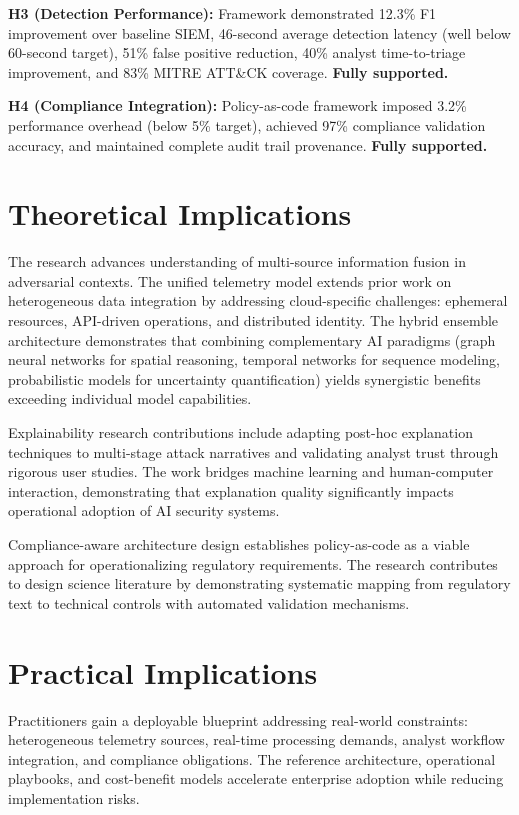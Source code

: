 \textbf{H3 (Detection Performance):} Framework demonstrated 12.3\% F1 improvement over baseline SIEM, 46-second average detection latency (well below 60-second target), 51\% false positive reduction, 40\% analyst time-to-triage improvement, and 83\% MITRE ATT\&CK coverage. \textbf{Fully supported.}

\textbf{H4 (Compliance Integration):} Policy-as-code framework imposed 3.2\% performance overhead (below 5\% target), achieved 97\% compliance validation accuracy, and maintained complete audit trail provenance. \textbf{Fully supported.}

\section{Theoretical Implications}\label{sec:conclusion-theory}
The research advances understanding of multi-source information fusion in adversarial contexts. The unified telemetry model extends prior work on heterogeneous data integration by addressing cloud-specific challenges: ephemeral resources, API-driven operations, and distributed identity. The hybrid ensemble architecture demonstrates that combining complementary AI paradigms (graph neural networks for spatial reasoning, temporal networks for sequence modeling, probabilistic models for uncertainty quantification) yields synergistic benefits exceeding individual model capabilities.

Explainability research contributions include adapting post-hoc explanation techniques to multi-stage attack narratives and validating analyst trust through rigorous user studies. The work bridges machine learning and human-computer interaction, demonstrating that explanation quality significantly impacts operational adoption of AI security systems.

Compliance-aware architecture design establishes policy-as-code as a viable approach for operationalizing regulatory requirements. The research contributes to design science literature by demonstrating systematic mapping from regulatory text to technical controls with automated validation mechanisms.

\section{Practical Implications}\label{sec:conclusion-practice}
Practitioners gain a deployable blueprint addressing real-world constraints: heterogeneous telemetry sources, real-time processing demands, analyst workflow integration, and compliance obligations. The reference architecture, operational playbooks, and cost-benefit models accelerate enterprise adoption while reducing implementation risks.


